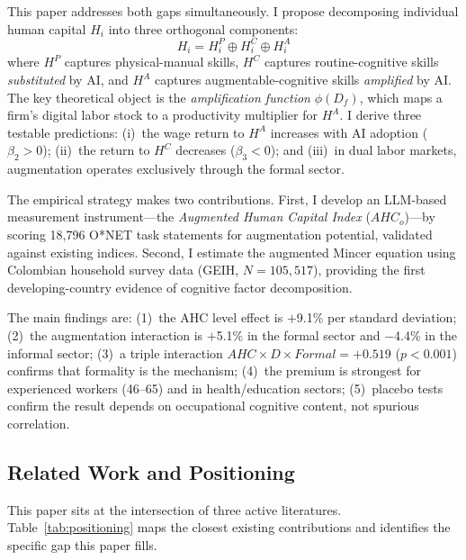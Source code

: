 \documentclass[11pt,a4paper]{article}
\theoremstyle{definition}
\begin{document}
This paper addresses both gaps simultaneously. I propose decomposing individual human capital $H_i$ into three orthogonal components:
\begin{equation}
H_i = H_i^P \oplus H_i^C \oplus H_i^A
\label{eq:decomposition}
\end{equation}
where $H^P$ captures physical-manual skills, $H^C$ captures routine-cognitive skills \textit{substituted} by AI, and $H^A$ captures augmentable-cognitive skills \textit{amplified} by AI. The key theoretical object is the \textit{amplification function} $\phi(D_f)$, which maps a firm's digital labor stock to a productivity multiplier for $H^A$. I derive three testable predictions: (i)~the wage return to $H^A$ increases with AI adoption ($\beta_2 > 0$); (ii)~the return to $H^C$ decreases ($\beta_3 < 0$); and (iii)~in dual labor markets, augmentation operates exclusively through the formal sector.

The empirical strategy makes two contributions. First, I develop an LLM-based measurement instrument---the \textit{Augmented Human Capital Index} ($AHC_o$)---by scoring 18,796 O*NET task statements for augmentation potential, validated against existing indices. Second, I estimate the augmented Mincer equation using Colombian household survey data (GEIH, $N = 105{,}517$), providing the first developing-country evidence of cognitive factor decomposition.

The main findings are: (1)~the AHC level effect is $+$9.1\% per standard deviation; (2)~the augmentation interaction is $+$5.1\% in the formal sector and $-$4.4\% in the informal sector; (3)~a triple interaction $AHC \times D \times Formal = +0.519$ ($p < 0.001$) confirms that formality is the mechanism; (4)~the premium is strongest for experienced workers (46--65) and in health/education sectors; (5)~placebo tests confirm the result depends on occupational cognitive content, not spurious correlation.

\subsection*{Related Work and Positioning}

This paper sits at the intersection of three active literatures. Table~\ref{tab:positioning} maps the closest existing contributions and identifies the specific gap this paper fills.
\end{document}
